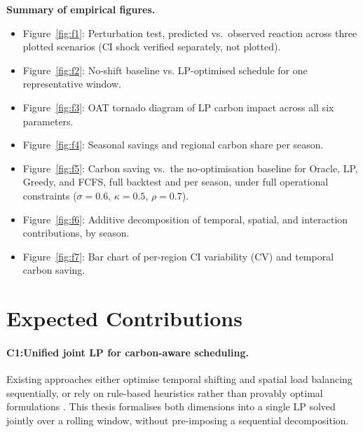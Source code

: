 \documentclass[11pt, a4paper]{article}
\begin{document}
\medskip
\noindent\textbf{Summary of empirical figures.}
\begin{itemize}
  \item Figure~\ref{fig:f1}: Perturbation test, predicted vs.\ observed reaction across three plotted scenarios (CI shock verified separately, not plotted).
  \item Figure~\ref{fig:f2}: No-shift baseline vs. LP-optimised schedule for one representative window.
  \item Figure~\ref{fig:f3}: OAT tornado diagram of LP carbon impact across all six parameters.
  \item Figure~\ref{fig:f4}: Seasonal savings and regional carbon share per season.
  \item Figure~\ref{fig:f5}: Carbon saving vs.\ the no-optimisation baseline for Oracle, LP, Greedy, and FCFS, full backtest and per season, under full operational constraints ($\sigma=0.6$, $\kappa=0.5$, $\rho=0.7$).
  \item Figure~\ref{fig:f6}: Additive decomposition of temporal, spatial, and interaction contributions, by season.
  \item Figure~\ref{fig:f7}: Bar chart of per-region CI variability (CV) and temporal carbon saving.
\end{itemize}

\section{Expected Contributions}

\paragraph{C1:Unified joint LP for carbon-aware scheduling.}
Existing approaches either optimise temporal shifting and spatial load balancing sequentially, or rely on rule-based heuristics rather than provably optimal formulations \citep{liu2012, radovanovic2023}. This thesis formalises both dimensions into a single LP solved jointly over a rolling window, without pre-imposing a sequential decomposition.
\end{document}
